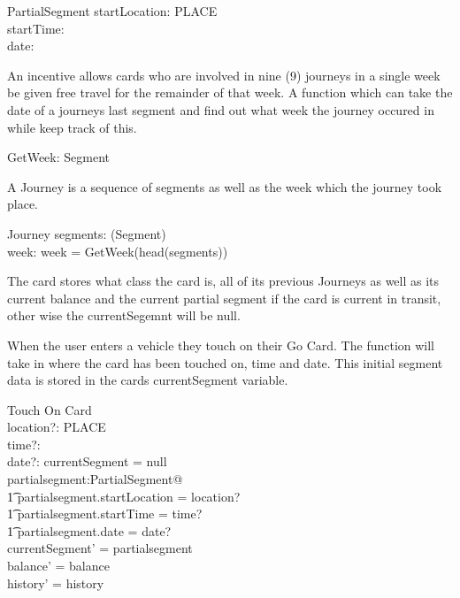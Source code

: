 \documentclass{article}
\begin{document}
\begin{schema}{PartialSegment}
startLocation: PLACE\\
startTime: \nat\\
date: \nat
\end{schema}

An incentive allows cards who are involved in nine (9) journeys in a single week be given free travel for the remainder of 
that week. A function which can take the date of a journeys last segment and find out what week the journey occured in
while keep track of this.

\begin{axdef}
GetWeek: Segment \fun \nat
\end{axdef}

A Journey is a sequence of segments as well as the week which the journey
took place.

\begin{schema}{Journey}
segments: \seq(Segment)\\
week: \nat
\where
week = GetWeek(head(segments))
\end{schema}

The card stores what class the card is, all of its previous Journeys as well as
its current balance and the current partial segment if the card is current in transit, other wise the currentSegemnt will be null.


When the user enters a vehicle they touch on their Go Card. The function will take in where the card has been touched on,
time and date. This initial segment data is stored in the cards currentSegment variable.

\begin{schema}{Touch On}
\Delta Card\\
location?: PLACE\\
time?: \nat\\
date?: \nat
\where
currentSegment = null\\
\exists partialsegment:PartialSegment@\\
\t1 partialsegment.startLocation = location?\\
\t1 partialsegment.startTime = time?\\
\t1 partialsegment.date = date?\\
currentSegment' = partialsegment\\
balance' = balance\\
history' = history
\end{schema}
\end{document}

